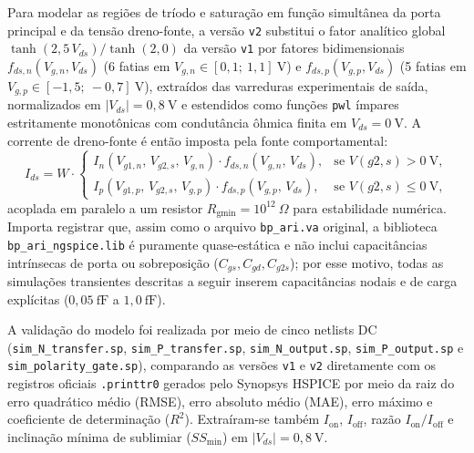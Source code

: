 Para modelar as regi\~{o}es de tr\'{i}odo e satura\c{c}\~{a}o em fun\c{c}\~{a}o simult\^{a}nea da porta principal e da tens\~{a}o dreno-fonte, a vers\~{a}o \texttt{v2} substitui o fator anal\'{i}tico global $\tanh(2{,}5\,V_{ds})/\tanh(2{,}0)$ da vers\~{a}o \texttt{v1} por fatores bidimensionais $f_{ds,n}(V_{g,n}, V_{ds})$ (6 fatias em $V_{g,n} \in [0{,}1;\ 1{,}1]\ \text{V}$) e $f_{ds,p}(V_{g,p}, V_{ds})$ (5 fatias em $V_{g,p} \in [-1{,}5;\ -0{,}7]\ \text{V}$), extra\'{i}dos das varreduras experimentais de sa\'{i}da, normalizados em $|V_{ds}| = 0{,}8\ \text{V}$ e estendidos como fun\c{c}\~{o}es \texttt{pwl} \'{i}mpares estritamente monot\^{o}nicas com condut\^{a}ncia \^{o}hmica finita em $V_{ds} = 0\ \text{V}$. A corrente de dreno-fonte \'{e} ent\~{a}o imposta pela fonte comportamental:
\begin{equation}\label{eq:bp_current}
I_{ds} = W \cdot \begin{cases}
I_n(V_{g1,n},\, V_{g2,s},\, V_{g,n}) \cdot f_{ds,n}(V_{g,n},\, V_{ds}), & \text{se } V(g2,s) > 0\ \text{V}, \\
I_p(V_{g1,p},\, V_{g2,s},\, V_{g,p}) \cdot f_{ds,p}(V_{g,p},\, V_{ds}), & \text{se } V(g2,s) \le 0\ \text{V},
\end{cases}
\end{equation}
acoplada em paralelo a um resistor $R_{\mathrm{gmin}} = 10^{12}\ \Omega$ para estabilidade num\'{e}rica. Importa registrar que, assim como o arquivo \texttt{bp\_ari.va} original, a biblioteca \texttt{bp\_ari\_ngspice.lib} \'{e} puramente quase-est\'{a}tica e n\~{a}o inclui capacit\^{a}ncias intr\'{i}nsecas de porta ou sobreposi\c{c}\~{a}o ($C_{gs}, C_{gd}, C_{g2s}$); por esse motivo, todas as simula\c{c}\~{o}es transientes descritas a seguir inserem capacit\^{a}ncias nodais e de carga expl\'{i}citas ($0{,}05\ \text{fF}$ a $1{,}0\ \text{fF}$).

A valida\c{c}\~{a}o do modelo foi realizada por meio de cinco netlists DC (\texttt{sim\_N\_transfer.sp}, \texttt{sim\_P\_transfer.sp}, \texttt{sim\_N\_output.sp}, \texttt{sim\_P\_output.sp} e \texttt{sim\_polarity\_gate.sp}), comparando as vers\~{o}es \texttt{v1} e \texttt{v2} diretamente com os registros oficiais \texttt{.printtr0} gerados pelo Synopsys HSPICE por meio da raiz do erro quadr\'{a}tico m\'{e}dio (RMSE), erro absoluto m\'{e}dio (MAE), erro m\'{a}ximo e coeficiente de determina\c{c}\~{a}o ($R^2$). Extra\'{i}ram-se tamb\'{e}m $I_{\mathrm{on}}$, $I_{\mathrm{off}}$, raz\~{a}o $I_{\mathrm{on}}/I_{\mathrm{off}}$ e inclina\c{c}\~{a}o m\'{i}nima de sublimiar ($SS_{\min}$) em $|V_{ds}| = 0{,}8\ \text{V}$.

